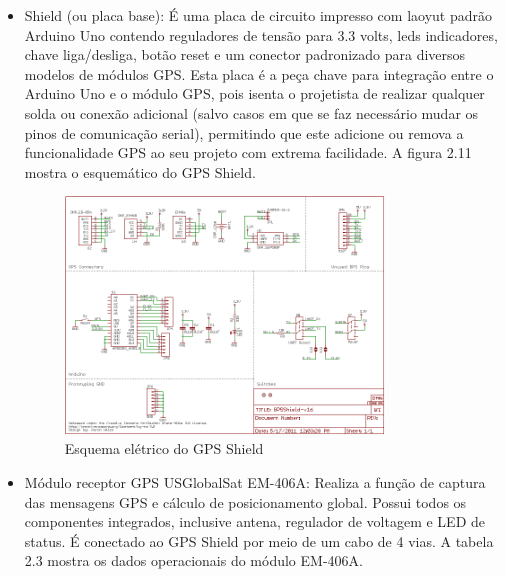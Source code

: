 \begin{itemize}
	\item Shield (ou placa base): É uma placa de circuito impresso com laoyut padrão Arduino Uno contendo reguladores de tensão para 3.3 volts, leds indicadores, chave liga/desliga, botão reset e um conector padronizado para diversos modelos de módulos GPS. Esta placa é a peça chave para integração entre o Arduino Uno e o módulo GPS, pois isenta o projetista de realizar qualquer solda ou conexão adicional (salvo casos em que se faz necessário mudar os pinos de comunicação serial), permitindo que este adicione ou remova a funcionalidade GPS ao seu projeto com extrema facilidade. A figura 2.11 mostra o esquemático do GPS Shield.

\begin{figure}[h!]
			\centering
			\includegraphics[width=0.8\textwidth]{figures/schemaGPS.png}
			\caption{Esquema elétrico do GPS Shield}
			\label{1}
\end{figure}


	\item Módulo receptor GPS USGlobalSat EM-406A: Realiza a função de captura das mensagens GPS e cálculo de posicionamento global. Possui todos os componentes integrados, inclusive antena, regulador de voltagem e LED de status. É conectado ao GPS Shield por meio de um cabo de 4 vias. A tabela 2.3 mostra os dados operacionais do módulo EM-406A.	
\end{itemize}

